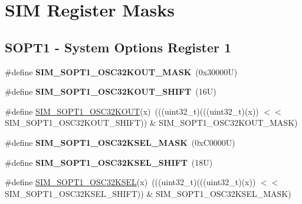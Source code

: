 \hypertarget{group___s_i_m___register___masks}{}\section{S\+IM Register Masks}
\label{group___s_i_m___register___masks}
\subsection*{S\+O\+P\+T1 -\/ System Options Register 1}
\begin{DoxyCompactItemize}
\item 
\mbox{\label{group___s_i_m___register___masks_ga81cebedfbcab734ebd30a05e5b61652c}} 
\#define {\bfseries S\+I\+M\+\_\+\+S\+O\+P\+T1\+\_\+\+O\+S\+C32\+K\+O\+U\+T\+\_\+\+M\+A\+SK}~(0x30000\+U)
\item 
\mbox{\label{group___s_i_m___register___masks_gac274ffbf68a679b2c544225333829f1b}} 
\#define {\bfseries S\+I\+M\+\_\+\+S\+O\+P\+T1\+\_\+\+O\+S\+C32\+K\+O\+U\+T\+\_\+\+S\+H\+I\+FT}~(16\+U)
\item 
\#define \mbox{\hyperlink{group___s_i_m___register___masks_ga6b22ff4edd2e91d195264946f8cc672b}{S\+I\+M\+\_\+\+S\+O\+P\+T1\+\_\+\+O\+S\+C32\+K\+O\+UT}}(x)~(((uint32\+\_\+t)(((uint32\+\_\+t)(x)) $<$$<$ S\+I\+M\+\_\+\+S\+O\+P\+T1\+\_\+\+O\+S\+C32\+K\+O\+U\+T\+\_\+\+S\+H\+I\+FT)) \& S\+I\+M\+\_\+\+S\+O\+P\+T1\+\_\+\+O\+S\+C32\+K\+O\+U\+T\+\_\+\+M\+A\+SK)
\item 
\mbox{\label{group___s_i_m___register___masks_ga5c660cd4a6d8062e6ef4afbc17c27fa4}} 
\#define {\bfseries S\+I\+M\+\_\+\+S\+O\+P\+T1\+\_\+\+O\+S\+C32\+K\+S\+E\+L\+\_\+\+M\+A\+SK}~(0x\+C0000\+U)
\item 
\mbox{\label{group___s_i_m___register___masks_gac9e930c4ee375a2aee6fa6c97e061226}} 
\#define {\bfseries S\+I\+M\+\_\+\+S\+O\+P\+T1\+\_\+\+O\+S\+C32\+K\+S\+E\+L\+\_\+\+S\+H\+I\+FT}~(18\+U)
\item 
\#define \mbox{\hyperlink{group___s_i_m___register___masks_gaf89520e7506a3dec707983ab729aef08}{S\+I\+M\+\_\+\+S\+O\+P\+T1\+\_\+\+O\+S\+C32\+K\+S\+EL}}(x)~(((uint32\+\_\+t)(((uint32\+\_\+t)(x)) $<$$<$ S\+I\+M\+\_\+\+S\+O\+P\+T1\+\_\+\+O\+S\+C32\+K\+S\+E\+L\+\_\+\+S\+H\+I\+FT)) \& S\+I\+M\+\_\+\+S\+O\+P\+T1\+\_\+\+O\+S\+C32\+K\+S\+E\+L\+\_\+\+M\+A\+SK)

\end{DoxyCompactItemize}
